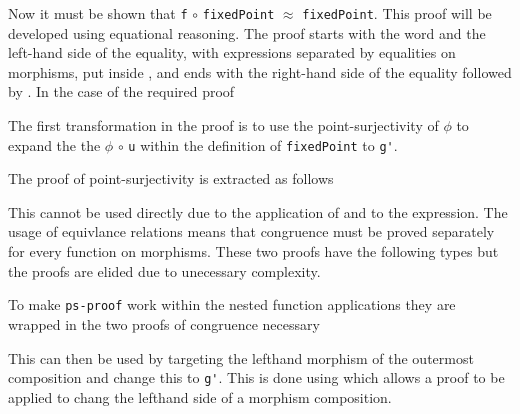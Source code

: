 Now it must be shown that \verb|f| $\circ$ \verb|fixedPoint| $\approx$
\verb|fixedPoint|. This proof will be developed using equational reasoning. The
proof starts with the word  and the left-hand side of the
equality, with expressions separated by
equalities on morphisms, put inside
\AgdaSpace{}, and
ends with the right-hand side of the equality followed by
. In the case of the required proof


The first transformation in the proof is to use the point-surjectivity of
$\phi$ to expand the the $\phi$ $\circ$ \verb|u| within the definition of
\verb|fixedPoint| to \verb|g'|.

The proof of point-surjectivity is extracted as follows


This cannot be used directly due to the application of  and
 to the expression. The usage of equivlance relations
means that congruence must be proved separately for every function on
morphisms. These two proofs have the following types but the proofs are elided
due to unecessary complexity.

\begin{AgdaSuppressSpace}
\end{AgdaSuppressSpace}

To make \verb|ps-proof| work within the nested function applications they are
wrapped in the two proofs of congruence necessary


This can then be used by targeting the lefthand morphism of the outermost
composition and change this to \verb|g'|. This is done using
 which allows a proof to be applied to chang the lefthand
side of a morphism composition.

